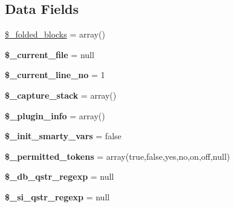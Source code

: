\subsection*{Data Fields}
\begin{DoxyCompactItemize}
\item 
\mbox{\hyperlink{class_smarty___compiler_a5b442e7183b1d6185f782354b9fb4665}{\$\+\_\+folded\+\_\+blocks}} = array()
\item 
\mbox{\label{class_smarty___compiler_a4c6ef40a0c9534d4c25ec77cd4e8d388}} 
{\bfseries \$\+\_\+current\+\_\+file} = null
\item 
\mbox{\label{class_smarty___compiler_ac9f9994f6a399d7a682d828324e153b2}} 
{\bfseries \$\+\_\+current\+\_\+line\+\_\+no} = 1
\item 
\mbox{\label{class_smarty___compiler_a432edd60bdfac5d87814fb00c2661b20}} 
{\bfseries \$\+\_\+capture\+\_\+stack} = array()
\item 
\mbox{\label{class_smarty___compiler_a9adea7e6332e251373f97475a608f449}} 
{\bfseries \$\+\_\+plugin\+\_\+info} = array()
\item 
\mbox{\label{class_smarty___compiler_aeff0dc90f88a8159fc26365ada4b9c7f}} 
{\bfseries \$\+\_\+init\+\_\+smarty\+\_\+vars} = false
\item 
\mbox{\label{class_smarty___compiler_ad2fab67ee277e3420a9add51850c52cd}} 
{\bfseries \$\+\_\+permitted\+\_\+tokens} = array(\textquotesingle{}true\textquotesingle{},\textquotesingle{}false\textquotesingle{},\textquotesingle{}yes\textquotesingle{},\textquotesingle{}no\textquotesingle{},\textquotesingle{}on\textquotesingle{},\textquotesingle{}off\textquotesingle{},\textquotesingle{}null\textquotesingle{})
\item 
\mbox{\label{class_smarty___compiler_a08f3b03133a4c421b057ed0fbe9fde1f}} 
{\bfseries \$\+\_\+db\+\_\+qstr\+\_\+regexp} = null
\item 
\mbox{\label{class_smarty___compiler_ae0f5ad8fa4f39bf3841b4050118639e4}} 
{\bfseries \$\+\_\+si\+\_\+qstr\+\_\+regexp} = null

\end{DoxyCompactItemize}
